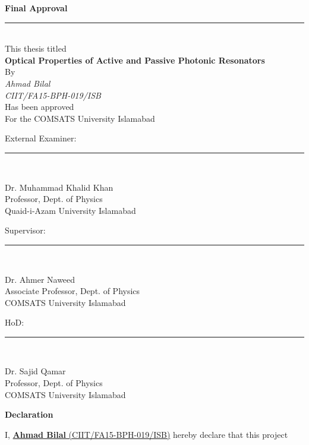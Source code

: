 \documentclass[12pt,twoside]{report}
\begin{document}
	\begin{center}
		\textbf{\Large{Final Approval}}
		\noindent\rule{15cm}{1pt} \\

		This thesis titled\\
		\vspace{0.5cm}
{\Large \textbf {Optical Properties of Active and Passive Photonic Resonators}}\\
\vspace{0.3cm}
By\\
\emph{Ahmad Bilal}\\
\emph{CIIT/FA15-BPH-019/ISB}\\
\vspace{0.1 in}
Has been approved\\
\vspace{0.1 in}
For the COMSATS University Islamabad\\
\end{center}
\vspace{0.5cm}
External Examiner: \noindent\rule{8cm}{0.4pt}\\
\begin{center}
	Dr. Muhammad Khalid Khan\\
	Professor, Dept. of Physics\\
	Quaid-i-Azam University Islamabad\\
\end{center}
Supervisor: \hspace{1.35cm}\noindent\rule{8cm}{0.4pt}\\
\begin{center}
	Dr. Ahmer Naweed\\
	Associate Professor, Dept. of Physics\\
	COMSATS University Islamabad\\
\end{center}
\vspace{0.5cm}
HoD: \hspace{2.5cm}\noindent\rule{8cm}{0.4pt}\\
\begin{center}
	Dr. Sajid Qamar\\
	Professor, Dept. of Physics\\
	COMSATS University Islamabad
\end{center}
	\newpage
	\begin{center}
		\textbf{\Large{Declaration}}
		\end{center}
I, \underline{\textbf{Ahmad Bilal} (CIIT/FA15-BPH-019/ISB)} hereby declare that this project
\end{document}
